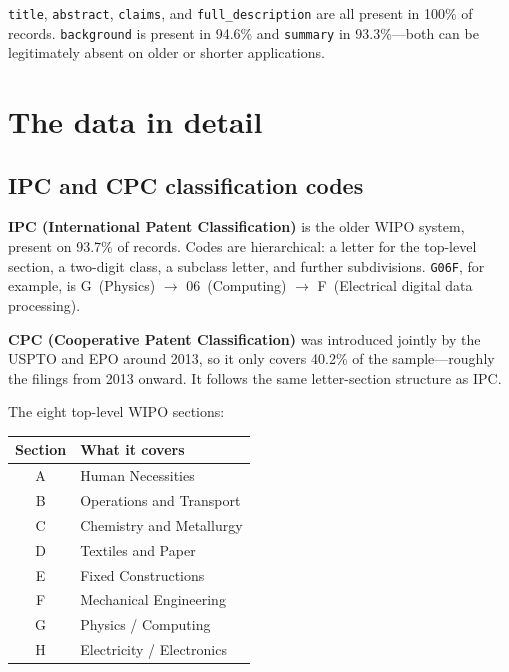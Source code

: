 \documentclass[11pt]{article}
\begin{document}
\texttt{title}, \texttt{abstract}, \texttt{claims}, and \texttt{full\_description} are
all present in 100\% of records. \texttt{background} is present in 94.6\% and
\texttt{summary} in 93.3\%---both can be legitimately absent on older or shorter applications.

\section{The data in detail}

\subsection{IPC and CPC classification codes}

\textbf{IPC (International Patent Classification)} is the older WIPO system, present on
93.7\% of records. Codes are hierarchical: a letter for the top-level section, a
two-digit class, a subclass letter, and further subdivisions. \texttt{G06F}, for example,
is G~(Physics) $\to$ 06~(Computing) $\to$ F~(Electrical digital data processing).

\textbf{CPC (Cooperative Patent Classification)} was introduced jointly by the USPTO and
EPO around 2013, so it only covers 40.2\% of the sample---roughly the filings from 2013
onward. It follows the same letter-section structure as IPC.

The eight top-level WIPO sections:

\begin{center}
\small
\begin{tabular}{cl}
  \toprule
  \textbf{Section} & \textbf{What it covers} \\
  \midrule
  A & Human Necessities \\
  B & Operations and Transport \\
  C & Chemistry and Metallurgy \\
  D & Textiles and Paper \\
  E & Fixed Constructions \\
  F & Mechanical Engineering \\
  G & Physics / Computing \\
  H & Electricity / Electronics \\
  \bottomrule
\end{tabular}
\end{center}
\end{document}
